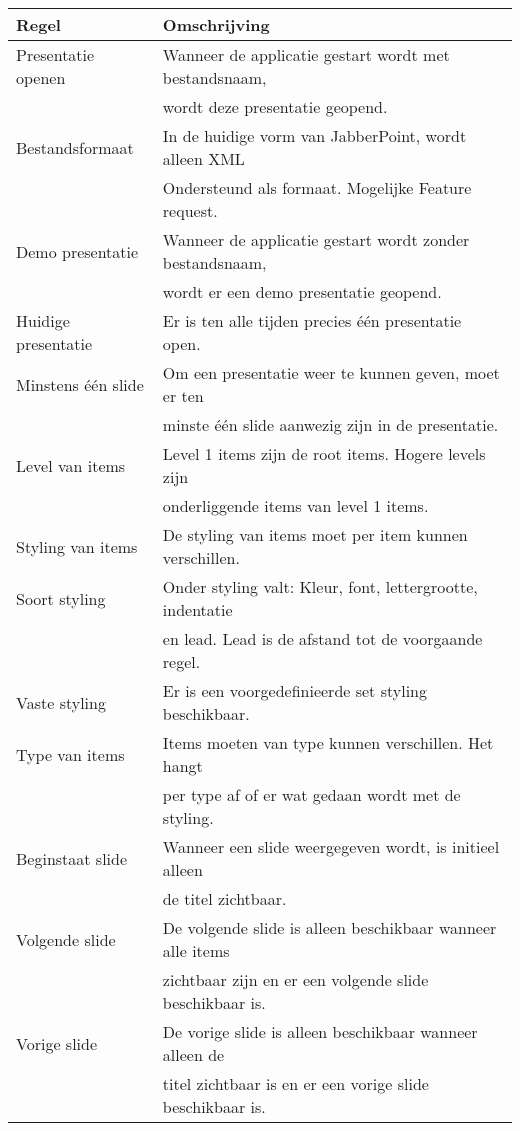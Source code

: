 \documentclass[a4paper]{article}
\newcommand{\1}[0]{\'{e}\'{e}n}
\begin{document}
\begin{table}[!h]
\centering
	\begin{tabular}{ll}
	\toprule
 	Regel & Omschrijving \\ \midrule
 	Presentatie openen & Wanneer de applicatie gestart wordt met bestandsnaam, \\& wordt deze presentatie geopend. \\
 	 Bestandsformaat & In de huidige vorm van JabberPoint, wordt alleen XML \\& Ondersteund als formaat. Mogelijke Feature request.\\
 	Demo presentatie & Wanneer de applicatie gestart wordt zonder bestandsnaam, \\& wordt er een demo presentatie geopend.\\
 	Huidige presentatie & Er is ten alle tijden precies \1 presentatie open.\\
 	Minstens \1 slide & Om een presentatie weer te kunnen geven, moet er ten \\& minste \1 slide aanwezig zijn in de presentatie.\\
 	Level van items & Level 1 items zijn de root items. Hogere levels zijn \\& onderliggende items van level 1 items.\\
 	Styling van items & De styling van items moet per item kunnen verschillen.\\
 	Soort styling & Onder styling valt: Kleur, font, lettergrootte, indentatie \\& en lead. Lead is de afstand tot de voorgaande regel.\\
 	Vaste styling & Er is een voorgedefinieerde set styling beschikbaar.\\
 	Type van items & Items moeten van type kunnen verschillen. Het hangt \\& per type af of er wat gedaan wordt met de styling.\\
 	Beginstaat slide & Wanneer een slide weergegeven wordt, is initieel alleen \\& de titel zichtbaar. \\
 	Volgende slide & De volgende slide is alleen beschikbaar wanneer alle items \\& zichtbaar zijn en er een volgende slide beschikbaar is.\\
 	Vorige slide & De vorige slide is alleen beschikbaar wanneer alleen de \\& titel zichtbaar is en er een vorige slide beschikbaar is.\\

\end{tabular}
\end{table}
\end{document}
